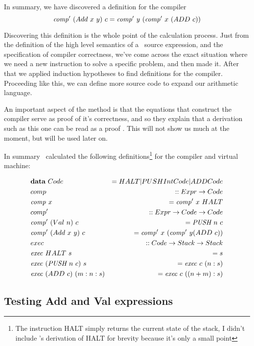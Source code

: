 \documentclass {article}
\begin{document}
In summary, we have discovered a definition for the
compiler
\begin{equation*}
\mathit{comp'\ }  (Add\ x\ y)\ c
= \mathit{comp'\ } y\ (\mathit{comp'\ } x\ (ADD\  c))
\end{equation*}

Discovering this definition is the 
whole point of the calculation process.
Just from the definition of the high level semantics 
of a \val\ source expression, and the specification 
of compiler correctness, we've come across the
exact situation where we need a new instruction
to solve a specific problem,
and then made it. After that we applied induction
hypotheses to find definitions for the compiler. 
Proceeding like this, we can
define more source code to expand our arithmetic language.

An important aspect of the \BH method
is that the equations that construct the 
compiler serve as proof of it's correctness,
and so they explain that a derivation such as
this one can be read as a proof \cite[page 14]{bandh}.
This will not show us much at the moment,
but will be used later on.

In summary \BH\ calculated the following definitions\footnote{
The instruction HALT simply returns the current state of the stack,
I didn't include \BH's derivation of HALT for brevity because
it's only a small point}
for the compiler and virtual machine:

\begin{eqnarray}
	&\textbf{data}\ Code &= HALT | PUSH Int Code | ADD Code \nonumber \\
	&comp &:: Expr \rightarrow Code \nonumber \\
	&\mathit{comp\ } x &= \mathit{comp'\ }  x\ HALT \label{comp}\\
	&comp' &:: Expr \rightarrow Code \rightarrow Code \nonumber \\
	&\mathit{comp'\ }  (Val\ n)\ c &= \textit{PUSH\ } n\ c \nonumber \\
	&\mathit{comp'\ }  (Add\ x\ y)\ c 
				&= \mathit{comp'\ }  x\ (\mathit{comp'\ }  y (ADD\ c)) \label{compadd}\\
	&exec &:: Code  \rightarrow Stack \rightarrow Stack \nonumber \\
	&\mathit{exec\ } HALT\ s &= s \label{exechalt}\\
	&\mathit{exec\ } (\textit{PUSH\ } n\ c)\ s &= \mathit{exec\ } c\ (n:s) \label{execpush}\\
	&\mathit{exec\ } (ADD\ c)\ (m:n:s) &= \mathit{exec\ } c\ ((n + m):s) \label{execadd}
\end{eqnarray}

\subsection{Testing Add and Val expressions}
\end{document}

